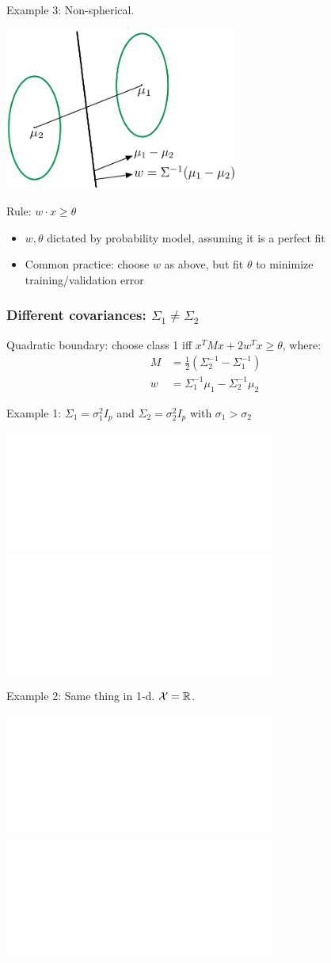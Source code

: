 \documentclass[smaller]{beamer}
\def\X{{\cal X}}
\def\R{{\mathbb R}}
\def\darkred{\color{red!70!black}}
\def\vone{{\vskip.1in}}
\def\R{{\mathbb R}}
\begin{document}
%

\begin{frame}

{\darkred Example 3: Non-spherical.}

\begin{center}
\includegraphics[width=3in]{discriminant4.pdf}
\end{center}

\pause\vone
\alert{Rule: $w \cdot x \geq \theta$}
\begin{itemize}
\item $w,\theta$ dictated by probability model, assuming it is a perfect fit
\item Common practice: choose $w$ as above, but fit $\theta$ to minimize training/validation error
\end{itemize}

\end{frame}

\begin{frame}
\frametitle{Different covariances: $\Sigma_1 \neq \Sigma_2$}

\alert{Quadratic boundary: choose class 1 iff 
$x^T M x + 2 w^T x \geq \theta$, where:
\begin{align*}
M &= \frac{1}{2}(\Sigma_2^{-1} - \Sigma_1^{-1}) \\
w &= \Sigma_1^{-1} \mu_1 - \Sigma_2^{-1} \mu_2 
\end{align*}}

{\darkred Example 1: $\Sigma_1 = \sigma_1^2 I_p$ and $\Sigma_2 = \sigma_2^2 I_p$ with $\sigma_1 > \sigma_2$}

\begin{center}
\includegraphics<1>[width=3.5in]{discriminant6.pdf}
\includegraphics<2->[width=3.5in]{discriminant5.pdf}
\end{center}

\end{frame}
%

\begin{frame}

{\darkred Example 2: Same thing in 1-d. $\X = \R$.}

\begin{center}
\includegraphics<1>[width=3.5in]{discriminant8.pdf}
\includegraphics<2->[width=3.5in]{discriminant7.pdf}
\end{center}

\end{frame}
\end{document}
